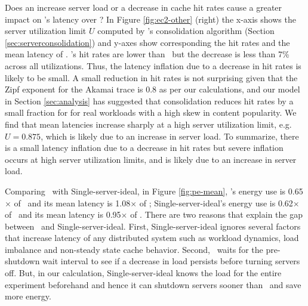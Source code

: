 Does  an increase server load or a decrease in cache hit rates cause a greater impact on \shrink's latency over \peakS? 
In Figure \ref{fig:ec2-other} (right) the x-axis shows the server utilization limit $U$ computed by \shrink's consolidation algorithm (Section \ref{sec:serverconsolidation}) and y-axes show corresponding the  hit rates and the mean latency of \shrink. \shrink's  hit rates are lower than \peakS\ but the decrease is less than 7\% across all utilizations. 
Thus, the latency inflation due to a decrease in hit rates is likely to be small. A small reduction in hit rates is not surprising given that the Zipf exponent for the Akamai trace is 0.8 as per our calculations, and our model in Section \ref{sec:analysis} has suggested that  consolidation reduces hit rates by a small fraction for for real workloads with a high skew in content popularity.  We find that mean latencies increase sharply at  a high server utilization limit, e.g. $U=0.875$, which is likely due to an increase in server load. To summarize, there is a small latency inflation due to a decrease in hit rates but severe inflation occurs at high server utilization limits, and is likely due to an increase in server  load.


Comparing \shrink\ with Single-server-ideal, in Figure \ref{fig:pe-mean}, \shrink's energy use is 0.65$\times$ of \peakS\ and its mean latency is 1.08$\times$ of \peakS; Single-server-ideal's energy use is 0.62$\times$  of \peakS\ and its mean latency is 0.95$\times$ of \peakS.  
There are two reasons that explain the gap between \shrink\ and Single-server-ideal. First, Single-server-ideal ignores several factors that increase latency of any distributed system such as workload dynamics, load imbalance and non-steady state cache behavior. Second, \shrink\ waits for the pre-shutdown wait interval to see if a decrease in load persists before turning servers off. But, in our calculation, Single-server-ideal knows the load for the entire experiment beforehand and hence it can shutdown servers sooner than \shrink\ and save more energy.


